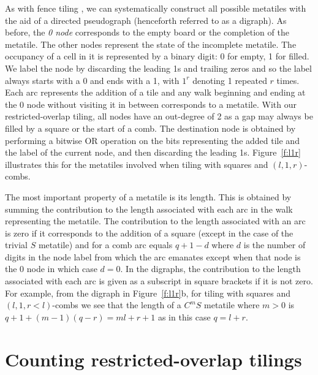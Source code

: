 \documentclass[preprint,3p]{elsarticle}
\begin{document}
As with fence tiling \cite{EA15}, we can systematically construct all
possible metatiles with the aid of a directed pseudograph (henceforth
referred to as a digraph). As before, the \textit{0 node} corresponds
to the empty board or the completion of the metatile. The other nodes
represent the state of the incomplete metatile.  The occupancy of a
cell in it is represented by a binary digit: 0 for empty, 1 for
filled. We label the node by discarding the leading 1s and trailing
zeros and so the label always starts with a 0 and ends with a 1,
with $1^r$ denoting 1 repeated $r$ times. 
Each
arc represents the addition of a tile and any walk beginning and
ending at the 0 node without visiting it in between corresponds to a
metatile.  With our restricted-overlap tiling, all nodes have an
out-degree of 2 as a gap may always be filled by a square or the start
of a comb. The destination node is obtained by performing a bitwise OR
operation on the bits representing the added tile and the label of
the current node, and then discarding the leading
1s. Figure~\ref{f:l1r} illustrates this for the metatiles
involved when tiling with squares and $(l,1,r)$-combs.

The most important property of a metatile is its length. This is
obtained by summing the contribution to the length associated with
each arc in the walk representing the metatile. The contribution to
the length associated with an arc is zero if it corresponds to the
addition of a square (except in the case of the trivial $S$ metatile)
and for a comb arc equals $q+1-d$ where $d$ is the number of digits in
the node label from which the arc emanates except when that node is
the 0 node in which case $d=0$.
In the digraphs, the contribution to the length associated with each arc is
given as a subscript in square brackets if it is not zero.
For example, from the digraph in
Figure~\ref{f:l1r}b, for tiling with squares and $(l,1,r<l)$-combs we
see that the length of a $C^mS$ metatile where $m>0$ is
$q+1+(m-1)(q-r)=ml+r+1$ as in this case $q=l+r$.

\section{Counting restricted-overlap tilings}
\label{s:counting}
\end{document}
